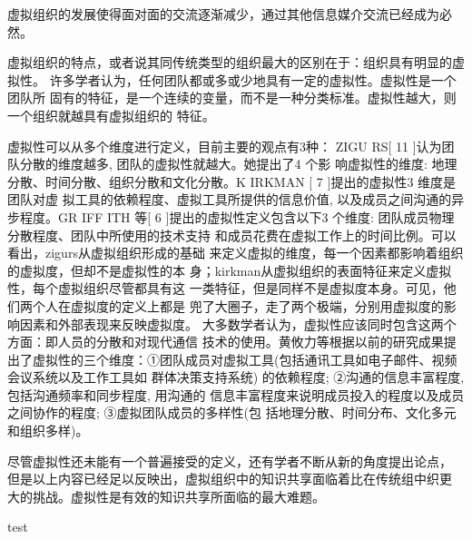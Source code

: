 \documentclass[12pt,a4paper]{ctexart}
\begin{document}
虚拟组织的发展使得面对面的交流逐渐减少，通过其他信息媒介交流已经成为必
然。

虚拟组织的特点，或者说其同传统类型的组织最大的区别在于：组织具有明显的虚拟性。
许多学者认为，任何团队都或多或少地具有一定的虚拟性。虚拟性是一个团队所
固有的特征，是一个连续的变量，而不是一种分类标准。虚拟性越大，则一个组织就越具有虚拟组织的
特征。

虚拟性可以从多个维度进行定义，目前主要的观点有3种：
ZIGU RS[ 11 ]认为团队分散的维度越多, 团队的虚拟性就越大。她提出了4 个影
响虚拟性的维度:
地理分散、时间分散、组织分散和文化分散。K IRKMAN [ 7 ]提出的虚拟性3 维度是团队对虚
拟工具的依赖程度、虚拟工具所提供的信息价值, 以及成员之间沟通的异步程度。GR IFF ITH
等[ 6 ]提出的虚拟性定义包含以下3 个维度: 团队成员物理分散程度、团队中所使用的技术支持
和成员花费在虚拟工作上的时间比例。可以看出，zigurs从虚拟组织形成的基础
来定义虚拟的维度，每一个因素都影响着组织的虚拟度，但却不是虚拟性的本
身；kirkman从虚拟组织的表面特征来定义虚拟性，每个虚拟组织尽管都具有这
一类特征，但是同样不是虚拟度本身。可见，他们两个人在虚拟度的定义上都是
兜了大圈子，走了两个极端，分别用虚拟度的影响因素和外部表现来反映虚拟度。
大多数学者认为，虚拟性应该同时包含这两个方面：即人员的分散和对现代通信
技术的使用。黄攸力等\cite{huangyouliandliutuanjie}根据以前的研究成果提
出了虚拟性的三个维度：①团队成员对虚拟工具(包括通讯工具如电子邮件、视频会议系统以及工作工具如
群体决策支持系统) 的依赖程度; ②沟通的信息丰富程度, 包括沟通频率和同步程度, 用沟通的
信息丰富程度来说明成员投入的程度以及成员之间协作的程度; ③虚拟团队成员的多样性(包
括地理分散、时间分布、文化多元和组织多样)。

尽管虚拟性还未能有一个普遍接受的定义，还有学者不断从新的角度提出论点，
但是以上内容已经足以反映出，虚拟组织中的知识共享面临着比在传统组中织更
大的挑战。虚拟性是有效的知识共享所面临的最大难题。


test








\end{document}
